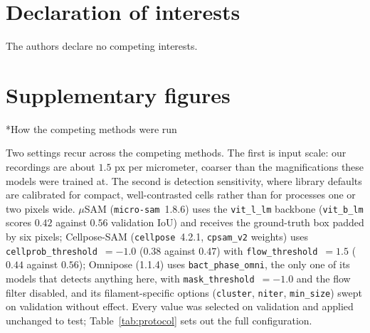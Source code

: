 \documentclass[11pt,a4paper]{article}
\makeatletter
\let\SD@subsection\subsection
\renewcommand\subsection{\FloatBarrier\@ifstar{\SD@subsection*}{\SD@subsection}}
\makeatother
\begin{document}
\section*{Declaration of interests}
The authors declare no competing interests.





\clearpage
\appendix
\section{Supplementary figures}
\label{sec:appendix}

\subsection*{How the competing methods were run}
\label{sec:supp:protocol}

\begin{sloppypar}
Two settings recur across the competing methods. The first is input scale:
our recordings are about $1.5$ px per micrometer, coarser than the
magnifications these models were trained at. The second is detection
sensitivity, where library defaults are calibrated for compact,
well-contrasted cells rather than for processes one or two pixels wide.
$\mu$SAM (\texttt{micro-sam}~1.8.6) uses the \texttt{vit\_l\_lm} backbone
(\texttt{vit\_b\_lm} scores $0.42$ against $0.56$ validation IoU) and receives
the ground-truth box padded by six pixels; Cellpose-SAM (\texttt{cellpose}~4.2.1,
\texttt{cpsam\_v2} weights) uses \texttt{cellprob\_threshold}~$=-1.0$ ($0.38$
against $0.47$) with \texttt{flow\_threshold}~$=1.5$ ($0.44$ against $0.56$);
Omnipose (1.1.4) uses \texttt{bact\_phase\_omni}, the only one of its models
that detects anything here, with \texttt{mask\_threshold}~$=-1.0$ and the flow
filter disabled, and its filament-specific options (\texttt{cluster},
\texttt{niter}, \texttt{min\_size}) swept on validation without effect. Every
value was selected on validation and applied unchanged to test;
Table~\ref{tab:protocol} sets out the full configuration.
\end{sloppypar}
\end{document}
